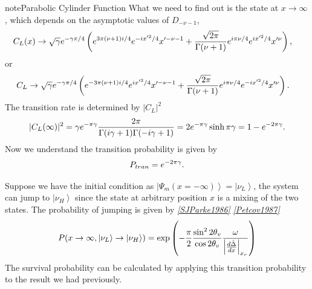 \documentclass[letterpaper,12pt,english]{sphinxmanual}
\newcommand{\ket}[1]{\left| #1\right\rangle}
\begin{document}
\begin{notice}{note}{Parabolic Cylinder Function}
What we need to find out is the state at \(x\to \infty\), which depends on the asymptotic values of \(D_{-\nu-1}\),
\begin{gather}
\begin{split}C_L(x) &\to \sqrt{\gamma} e^{-\gamma \pi/4} \left(  e^{3\pi (\nu+1)i/4} e^{-ix'^2/4} x'^{-\nu-1} + \frac{\sqrt{2\pi}}{ \Gamma (\nu+1) } e^{i \pi\nu/4} e^{i x'^2 /4} x'^\nu  \right) ,\end{split}\notag
\end{gather}
or
\begin{gather}
\begin{split}C_L & \to \sqrt{\gamma} e^{-\gamma \pi/4} \left(   e^{-3\pi (\nu+1)i/4} e^{ix'^2/4} x'^{-\nu-1} + \frac{\sqrt{2\pi}}{ \Gamma (\nu+1) } e^{i \pi\nu/4} e^{ - i x'^2 /4} x'^\nu   \right).\end{split}\notag
\end{gather}
The transition rate is determined by \(\lvert C_L \rvert^2\)
\begin{gather}
\begin{split}\lvert C_L(\infty) \rvert^2 = \gamma e^{-\pi\gamma} \frac{2\pi}{\Gamma(i\gamma +1) \Gamma(-i\gamma +1)} = 2e^{-\pi\gamma}\sinh \pi\gamma = 1-e^{-2\pi\gamma}.\end{split}\notag
\end{gather}
Now we understand the transition probability is given by
\begin{gather}
\begin{split}P_{tran} = e^{-2\pi\gamma}.\end{split}\notag
\end{gather}\end{notice}

Suppose we have the initial condition as \(\ket{\Psi_m(x=-\infty)} = \ket{\nu_L}\), the system can jump to \(\ket{\nu_H}\) since the state at arbitrary position \(x\) is a mixing of the two states. The probability of jumping is given by \label{msw:id3}{\hyperref[msw:sjparke1986]{\emph{{[}SJParke1986{]}}}} \label{msw:id4}{\hyperref[msw:petcov1987]{\emph{{[}Petcov1987{]}}}}
\begin{gather}
\begin{split}P(x\to \infty, \ket{\nu_L}\to\ket{\nu_H}) = \exp \left( -\frac{\pi}{2}\frac{\sin^2 2\theta_v}{\cos 2\theta_v} \frac{\omega}{\left\vert  \frac{d\hat\Delta}{dx} \right\vert_{x_r} } \right)\end{split}\notag
\end{gather}
The survival probability can be calculated by applying this transition probability to the result we had previously.
\end{document}
